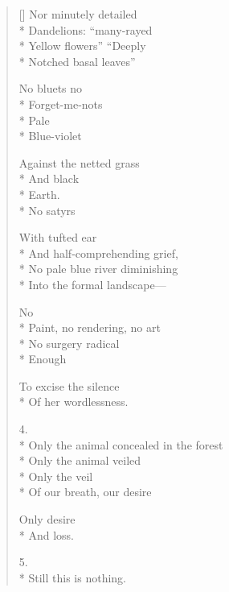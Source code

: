\begin{verse}[\versewidth]
Nor minutely detailed\\*
Dandelions: ``many-rayed\\*
Yellow flowers'' ``Deeply\\*
Notched basal leaves''

No bluets \quad no\\*
Forget-me-nots\\*
Pale\\*
Blue-violet

Against the netted grass\\*
And black\\*
Earth.\\*
No satyrs

With tufted ear\\*
And half-comprehending grief,\\*
No pale blue river diminishing\\*
Into the formal landscape---

No\\*
Paint, no rendering, no art\\*
No surgery radical\\*
Enough

To excise the silence\\*
Of her wordlessness.

4.\\*
Only the animal concealed in the forest\\*
Only the animal veiled\\*
Only the veil\\*
Of our breath, our desire

Only desire\\*
And loss.

5.\\*
Still this is nothing. 
\end{verse}
